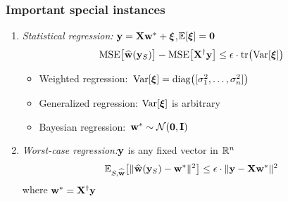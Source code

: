 \documentclass{beamer}
\begin{document}
\begin{frame}
  \frametitle{Important special instances}
  \begin{enumerate}
  \item    \textit{Statistical regression:}\quad
    $\mathbf y = \mathbf X\mathbf w^*+\boldsymbol\xi$,\quad $\mathbb E[\boldsymbol\xi]=\mathbf 0$
    \begin{align*}
      \mathrm{MSE}\big[\widehat{\mathbf w}(\mathbf y_S)\big] -
      \mathrm{MSE}\big[\mathbf X^\dagger\mathbf y\big]\leq \epsilon\cdot\mathrm{tr}\big(\mathrm{Var}[\boldsymbol\xi]\big)
    \end{align*}
    \pause\vspace{-5mm}
    \begin{itemize}
    \item Weighted regression:\quad\ 
      $\mathrm{Var}[\boldsymbol\xi]=\mathrm{diag}\big([\sigma_1^2,\dots,\sigma_n^2]\big)$\\[2mm]
      \pause
      \item Generalized regression: $\mathrm{Var}[\boldsymbol\xi]$ is
        arbitrary\\[2mm]
        \pause
        \item Bayesian regression: \quad \,$\mathbf w^*\sim\mathcal{N}(\mathbf 0,\mathbf I)$
        \end{itemize}
        \pause\vspace{5mm}
      \item \textit{Worst-case regression:}\quad $\mathbf y$ is any fixed vector in
        $\mathbb R^n$
        \pause
        \begin{align*}
      \mathbb E_{S,\widehat{\mathbf w}}\big[\|\widehat{\mathbf w}(\mathbf y_S)-\mathbf w^*\|^2\big]\leq \epsilon\cdot
          \|\mathbf y-\mathbf X\mathbf w^*\|^2
        \end{align*}
where $\mathbf w^*=\mathbf X^\dagger\mathbf y$
  \end{enumerate}
\end{frame}
\end{document}
